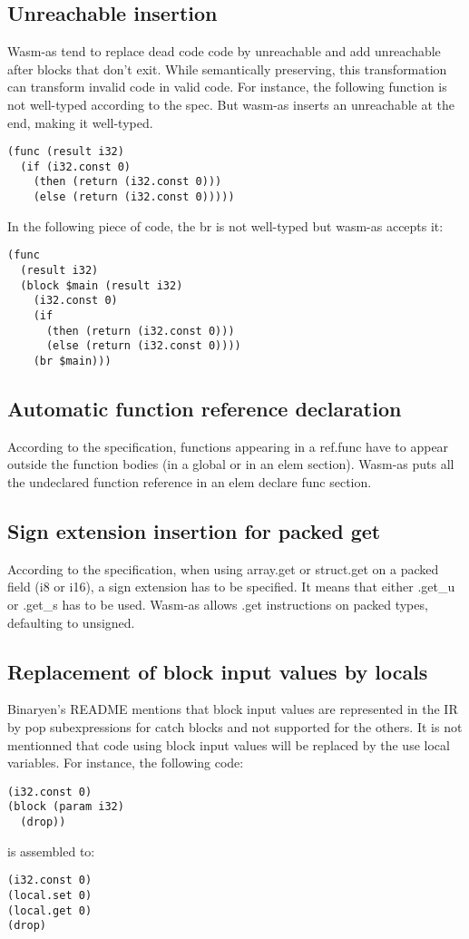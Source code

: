 \documentclass[a4paper,11pt]{article}
\begin{document}
\subsection{\textsf{Unreachable} insertion}
Wasm-as tend to replace dead code code by \textsf{unreachable} and add
\textsf{unreachable} after blocks that don't exit. While semantically
preserving, this transformation can transform invalid code in valid code. For
instance, the following function is not well-typed according to the spec. But
wasm-as inserts an \textsf{unreachable} at the end, making it well-typed.
\begin{lstlisting}
(func (result i32)
  (if (i32.const 0)
    (then (return (i32.const 0)))
    (else (return (i32.const 0)))))
\end{lstlisting}

In the following piece of code, the \textsf{br} is not well-typed but wasm-as accepts
it:
\begin{lstlisting}
(func
  (result i32)
  (block $main (result i32)
    (i32.const 0)
    (if
      (then (return (i32.const 0)))
      (else (return (i32.const 0))))
    (br $main)))
\end{lstlisting}
\subsection{Automatic function reference declaration}
According to the specification, functions appearing in a \textsf{ref.func} have to
appear outside the function bodies (in a global or in an elem section). Wasm-as
puts all the undeclared function reference in an \textsf{elem declare func} section.

\subsection{Sign extension insertion for packed get}
According to the specification, when using \textsf{array.get} or
\textsf{struct.get} on a packed field (\textsf{i8} or \textsf{i16}), a sign
extension has to be specified. It means that either \textsf{.get\_u} or
\textsf{.get\_s} has to be used. Wasm-as allows \textsf{.get} instructions on
packed types, defaulting to unsigned.

\subsection{Replacement of block input values by locals}
Binaryen's README mentions that block input values are represented in the IR by
\textsf{pop} subexpressions for \textsf{catch} blocks and not supported for the
others. It is not mentionned that code using block input values will be replaced
by the use local variables. For instance, the following code:
\begin{lstlisting}
(i32.const 0)
(block (param i32)
  (drop))
\end{lstlisting}
is assembled to:
\begin{lstlisting}
(i32.const 0)
(local.set 0)
(local.get 0)
(drop)
\end{lstlisting}
\end{document}
